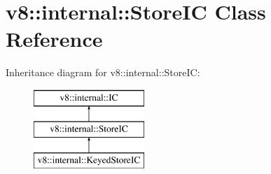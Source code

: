\hypertarget{classv8_1_1internal_1_1_store_i_c}{}\section{v8\+:\+:internal\+:\+:Store\+IC Class Reference}
\label{classv8_1_1internal_1_1_store_i_c}
Inheritance diagram for v8\+:\+:internal\+:\+:Store\+IC\+:\begin{figure}[H]
\begin{center}
\leavevmode
\includegraphics[height=3.000000cm]{classv8_1_1internal_1_1_store_i_c}
\end{center}
\end{figure}
